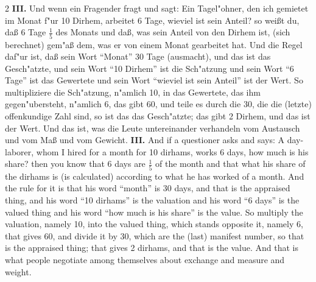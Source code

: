 \documentclass[10pt,a4paper]{article}
\renewcommand{\switchcolumn}{\syncronize\nointerlineskip\columnbreak}
\newcommand{\enquote}[1]{``#1''}
\begin{document}
\begin{paracol}{2}
\textbf{III.} Und wenn ein Fragender fragt und sagt: Ein Tagel"ohner, den ich gemietet im Monat f"ur 10 Dirhem, arbeitet 6 Tage, wieviel ist sein Anteil? so wei\ss{}t du, da\ss{} 6 Tage $\frac{1}{5}$ des Monats und da\ss{}, was sein Anteil von den Dirhem ist, (sich berechnet) gem"a\ss{} dem, was er von einem Monat gearbeitet hat. Und die Regel daf"ur ist, da\ss{} sein Wort \enquote{Monat} 30 Tage (ausmacht), und das ist das Gesch"atzte, und sein Wort \enquote{10 Dirhem} ist die Sch"atzung und sein Wort \enquote{6 Tage} ist das Gewertete und sein Wort \enquote{wieviel ist sein Anteil} ist der Wert. So multipliziere die Sch"atzung, n"amlich 10, in das Gewertete, das ihm gegen"ubersteht, n"amlich 6, das gibt 60, und teile es durch die 30, die die (letzte) offenkundige Zahl sind, so ist das das Gesch"atzte; das gibt 2 Dirhem, und das ist der Wert. Und das ist, was die Leute untereinander verhandeln vom Austausch und vom Ma\ss{} und vom Gewicht.
\switchcolumn
\textbf{III.} And if a questioner asks and says: A day-laborer, whom I hired for a month for 10 dirhams, works 6 days, how much is his share? then you know that 6 days are $\frac{1}{5}$ of the month and that what his share of the dirhams is (is calculated) according to what he has worked of a month. And the rule for it is that his word ``month'' is 30 days, and that is the appraised thing, and his word ``10 dirhams'' is the valuation and his word ``6 days'' is the valued thing and his word ``how much is his share'' is the value. So multiply the valuation, namely 10, into the valued thing, which stands opposite it, namely 6, that gives 60, and divide it by 30, which are the (last) manifest number, so that is the appraised thing; that gives 2 dirhams, and that is the value. And that is what people negotiate among themselves about exchange and measure and weight.
\end{paracol}
\end{document}

